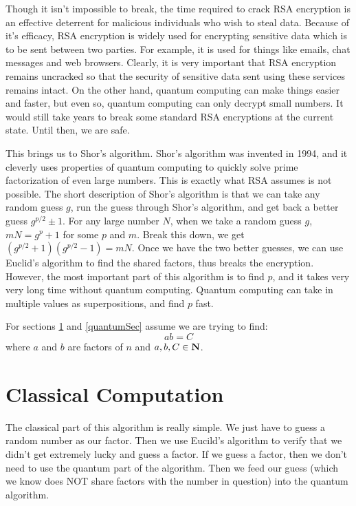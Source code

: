 \documentclass[a4paper]{article}
\begin{document}
Though it isn't impossible to break, the time required to crack RSA encryption is an effective deterrent for malicious individuals who wish to steal data. Because of it's efficacy, RSA encryption is widely used for encrypting sensitive data which is to be sent between two parties. For example, it is used for things like emails, chat messages and web browsers. Clearly, it is very important that RSA encryption remains uncracked so that the security of sensitive data sent using these services remains intact. On the other hand, quantum computing can make things easier and faster, but even so, quantum computing can only decrypt small numbers. It would still take years to break some standard RSA encryptions at the current state. Until then, we are safe.

This brings us to Shor's algorithm. Shor's algorithm was invented in 1994, and it cleverly uses properties of quantum computing to quickly solve prime factorization of even large numbers. This is exactly what RSA assumes is not possible. The short description of Shor's algorithm is that we can take any random guess $g$, run the guess through Shor's algorithm, and get back a better guess $g^{p/2} \pm 1$. For any large number $N$, when we take a random guess $g$, $mN = g^p +1$ for some $p$ and $m$. Break this down, we get $(g^{p/2}+1)(g^{p/2}-1) = mN$. Once we have the two better guesses, we can use Euclid's algorithm to find the shared factors, thus breaks the encryption. However, the most important part of this algorithm is to find $p$, and it takes very very long time without quantum computing. Quantum computing can take in multiple values as superpositions, and find $p$ fast.

For sections \ref{classicalSec} and \ref{quantumSec} assume we are trying to find: 
$$ab = C$$
where $a$ and $b$ are factors of $n$ and $a,b,C \in \mathbf{N}$.

\section{Classical Computation}
\label{classicalSec}
The classical part of this algorithm is really simple. We just have to guess a random number as our factor. Then we use Eucild's algorithm to verify that we didn't get extremely lucky and guess a factor. If we guess a factor, then we don't need to use the quantum part of the algorithm. Then we feed our guess (which we know does NOT share factors with the number in question) into the quantum algorithm. 
\end{document}
